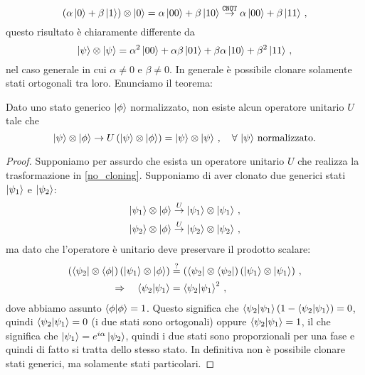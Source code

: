 \begin{equation*}
    \left( \alpha \ket{0} + \beta \ket{1} \right) \otimes \ket{0} = \alpha \ket{00} + \beta \ket{10} \overset{\texttt{CNOT}}{\rightarrow} \alpha \ket{00} + \beta \ket{11} \, ,
\end{equation*}
questo risultato è chiaramente differente da 
\begin{equation*}
    \ket{\psi} \otimes \ket{\psi} = \alpha^2 \ket{00} + \alpha \beta \ket{01} + \beta \alpha \ket{10} + \beta^2 \ket{11} \, ,
\end{equation*}
nel caso generale in cui $\alpha \neq 0$ e $\beta \neq 0$. In generale è possibile clonare solamente stati ortogonali tra loro. Enunciamo il teorema:

\begin{teorema}
    Dato uno stato generico $\ket{\phi}$ normalizzato, non esiste alcun operatore unitario $U$ tale che
    \begin{equation}\label{no_cloning}
        \ket{\psi} \otimes \ket{\phi} \rightarrow U \left( \ket{\psi} \otimes \ket{\phi} \right) = \ket{\psi} \otimes \ket{\psi} \, , \quad \forall \, \ket{\psi} \, {\rm normalizzato} . 
    \end{equation}
\end{teorema}

\begin{proof}
    Supponiamo per assurdo che esista un operatore unitario $U$ che realizza la trasformazione in \eqref{no_cloning}. Supponiamo di aver clonato due generici stati $\ket{\psi_1}$ e $\ket{\psi_2}$:
    \begin{align*}
        \ket{\psi_1} \otimes \ket{\phi} &\overset{U}{\rightarrow} \ket{\psi_1} \otimes \ket{\psi_1} \, , \\
        \ket{\psi_2} \otimes \ket{\phi} &\overset{U}{\rightarrow} \ket{\psi_2} \otimes \ket{\psi_2} \, ,
    \end{align*}
    ma dato che l'operatore è unitario deve preservare il prodotto scalare:
    \begin{align*}
        \left( \bra{\psi_2} \otimes \bra{\phi} \right) \left( \ket{\psi_1} \otimes \ket{\phi} \right) &\overset{?}{=} \left( \bra{\psi_2} \otimes \bra{\psi_2} \right) \left( \ket{\psi_1} \otimes \ket{\psi_1} \right) \, , \\
        \Rightarrow \quad \braket{\psi_2}{\psi_1} &= \braket{\psi_2}{\psi_1}^2 \, ,
    \end{align*}
    dove abbiamo assunto $\braket{\phi} = 1$. Questo significa che $\braket{\psi_2}{\psi_1} \left( 1 - \braket{\psi_2}{\psi_1} \right) = 0$, quindi $\braket{\psi_2}{\psi_1} = 0$ (i due stati sono ortogonali) oppure $\braket{\psi_2}{\psi_1} = 1$, il che significa che $\ket{\psi_1} = e^{i \alpha} \ket{\psi_2}$, quindi i due stati sono proporzionali per una fase e quindi di fatto si tratta dello stesso stato. In definitiva non è possibile clonare stati generici, ma solamente stati particolari. 
\end{proof}

